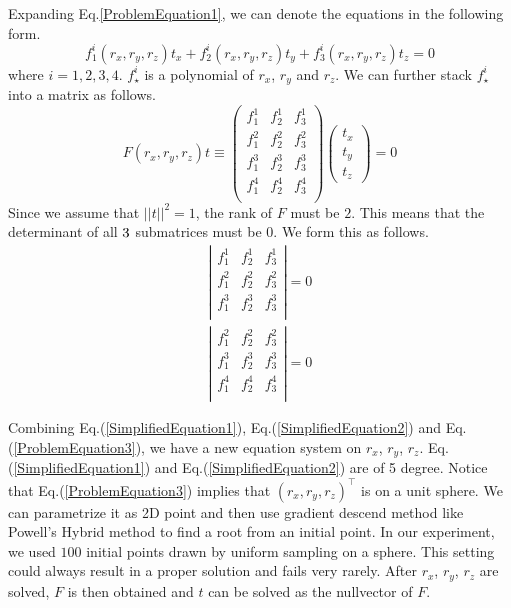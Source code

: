\documentclass{article}
\begin{document}
Expanding Eq.\ref{ProblemEquation1}, we can denote the equations in the following form. 
\begin{equation}
f_1^i(r_x, r_y, r_z) t_x + f_2^i(r_x, r_y, r_z) t_y + f_3^i(r_x, r_y, r_z) t_z = 0
\end{equation}
where $i = 1, 2, 3, 4$. $f_\star^i$ is a polynomial of $r_x$, $r_y$ and $r_z$. We can further stack $f_\star^i$ into a matrix as follows. 
\begin{equation}
F(r_x, r_y, r_z) t \equiv \left( 
	\begin{array}{clr}
	f_1^1 & f_2^1 & f_3^1 \\
	f_1^2 & f_2^2 & f_3^2 \\
	f_1^3 & f_2^3 & f_3^3 \\
	f_1^4 & f_2^4 & f_3^4 \\	
	\end{array}
\right) \left(
	\begin{array}{clr}
	t_x \\ t_y \\t_z
	\end{array}
\right) = 0	
\end{equation}
Since we assume that $||t||^2 = 1$, the rank of $F$ must be $2$. This means that the determinant of all $3 \time 3$ submatrices must be 0. We form this as follows. 
\begin{eqnarray}
\label{SimplifiedEquation1}
\left| 
	\begin{array}{clr}
	f_1^1 & f_2^1 & f_3^1 \\
	f_1^2 & f_2^2 & f_3^2 \\
	f_1^3 & f_2^3 & f_3^3 \\
	\end{array}
\right| = 0 \\ 
\label{SimplifiedEquation2}
\left| 
	\begin{array}{clr}
	f_1^2 & f_2^2 & f_3^2 \\
	f_1^3 & f_2^3 & f_3^3 \\
	f_1^4 & f_2^4 & f_3^4 \\	
	\end{array}
\right| = 0 
\end{eqnarray}

Combining Eq.(\ref{SimplifiedEquation1}), Eq.(\ref{SimplifiedEquation2}) and Eq.(\ref{ProblemEquation3}), we have a new equation system on $r_x$, $r_y$, $r_z$. Eq.(\ref{SimplifiedEquation1}) and Eq.(\ref{SimplifiedEquation2}) are of 5 degree. Notice that Eq.(\ref{ProblemEquation3}) implies that $(r_x, r_y, r_z)^\top$ is on a unit sphere. We can parametrize it as 2D point and then use gradient descend method like Powell's Hybrid method to find a root from an initial point. In our experiment, we used $100$ initial points drawn by uniform sampling on a sphere. This setting could always result in a proper solution and fails very rarely. After $r_x$, $r_y$, $r_z$ are solved, $F$ is then obtained and $t$ can be solved as the nullvector of $F$. 
\end{document}
